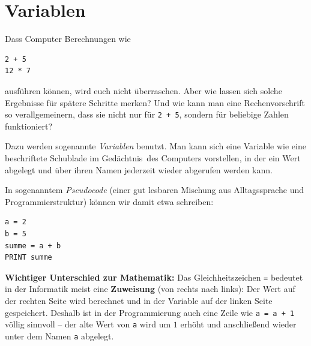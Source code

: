 \clearpage

\rehead[]{\textcolor{lightblue}{AvHG, Inf, My}}
\lohead[]{\textcolor{lightblue}{AvHG, Inf, My}}

\lstset{style=myJava}


\section{Variablen}

Dass Computer Berechnungen wie

\begin{lstlisting}
2 + 5
12 * 7
\end{lstlisting}

ausführen können, wird euch nicht überraschen. Aber wie lassen sich solche
Ergebnisse für spätere Schritte merken? Und wie kann man eine Rechenvorschrift
so verallgemeinern, dass sie nicht nur für \lstinline|2 + 5|, sondern für beliebige
Zahlen funktioniert?

Dazu werden sogenannte \emph{Variablen} benutzt. Man kann sich eine Variable wie
eine beschriftete Schublade im \glqq Gedächtnis\grqq\ des Computers vorstellen, in
der ein Wert abgelegt und über ihren Namen jederzeit wieder abgerufen werden kann.

In sogenanntem \emph{Pseudocode} (einer gut lesbaren Mischung aus Alltagssprache
und Programmierstruktur) können wir damit etwa schreiben:

\begin{lstlisting}
a = 2
b = 5
summe = a + b
PRINT summe
\end{lstlisting}

\noindent \textbf{Wichtiger Unterschied zur Mathematik:} Das Gleichheitszeichen
\lstinline|=| bedeutet in der Informatik meist eine \textbf{Zuweisung} (von
rechts nach links): Der Wert auf der rechten Seite wird berechnet und in der
Variable auf der linken Seite gespeichert. Deshalb ist in der Programmierung auch
eine Zeile wie \lstinline|a = a + 1| völlig sinnvoll -- der alte Wert von
\lstinline|a| wird um $1$ erhöht und anschließend wieder unter dem Namen
\lstinline|a| abgelegt.


